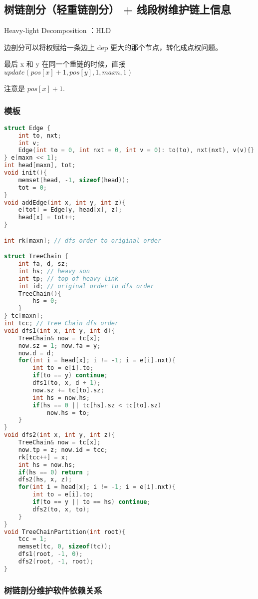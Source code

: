 \subsection{树链剖分（轻重链剖分） + 线段树维护链上信息}

Heavy-light Decomposition ：HLD

边剖分可以将权赋给一条边上 dep 更大的那个节点，转化成点权问题。

最后 x 和 y 在同一个重链的时候，直接 $update(pos[x] + 1 ,  pos[y], 1,  maxn, 1)$

注意是 $pos[x] + 1$.

\subsubsection{模板}

\begin{lstlisting}[language=C++]
struct Edge {
    int to, nxt;
    int v;
    Edge(int to = 0, int nxt = 0, int v = 0): to(to), nxt(nxt), v(v){}
} e[maxn << 1];
int head[maxn], tot;
void init(){
    memset(head, -1, sizeof(head));
    tot = 0;
}
void addEdge(int x, int y, int z){
    e[tot] = Edge(y, head[x], z);
    head[x] = tot++;
}

int rk[maxn]; // dfs order to original order

struct TreeChain {
    int fa, d, sz;
    int hs; // heavy son
    int tp; // top of heavy link
    int id; // original order to dfs order
    TreeChain(){
        hs = 0;
    }
} tc[maxn];
int tcc; // Tree Chain dfs order
void dfs1(int x, int y, int d){
    TreeChain& now = tc[x];
    now.sz = 1; now.fa = y;
    now.d = d;
    for(int i = head[x]; i != -1; i = e[i].nxt){
        int to = e[i].to;
        if(to == y) continue;
        dfs1(to, x, d + 1);
        now.sz += tc[to].sz;
        int hs = now.hs;
        if(hs == 0 || tc[hs].sz < tc[to].sz)
            now.hs = to;
    }
}
void dfs2(int x, int y, int z){
    TreeChain& now = tc[x];
    now.tp = z; now.id = tcc;
    rk[tcc++] = x;
    int hs = now.hs;
    if(hs == 0) return ;
    dfs2(hs, x, z);
    for(int i = head[x]; i != -1; i = e[i].nxt){
        int to = e[i].to;
        if(to == y || to == hs) continue;
        dfs2(to, x, to);
    }
}
void TreeChainPartition(int root){
    tcc = 1;
    memset(tc, 0, sizeof(tc));
    dfs1(root, -1, 0);
    dfs2(root, -1, root);
}
\end{lstlisting}

\subsubsection{树链剖分维护软件依赖关系}

